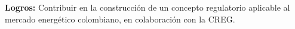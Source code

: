 \documentclass[theme]{cv_einstein}
\begin{document}
\begin{paracol}{2}
\begin{rightcolumn}
{            \textbf{Logros:} 
            Contribuir en la construcción de un concepto regulatorio aplicable al mercado energético colombiano, en colaboración con la CREG. }
            \vspace{0.2mm}\\
        \end{rightcolumn}
        \begin{leftcolumn*}\noindent \footnotesize
        {\color{white}
            \begin{minipage}[c]{\leftcolwidth}
                \begin{tabular}{r|l}

\end{tabular}
\end{minipage}}
\end{leftcolumn*}
\end{paracol}
\end{document}
